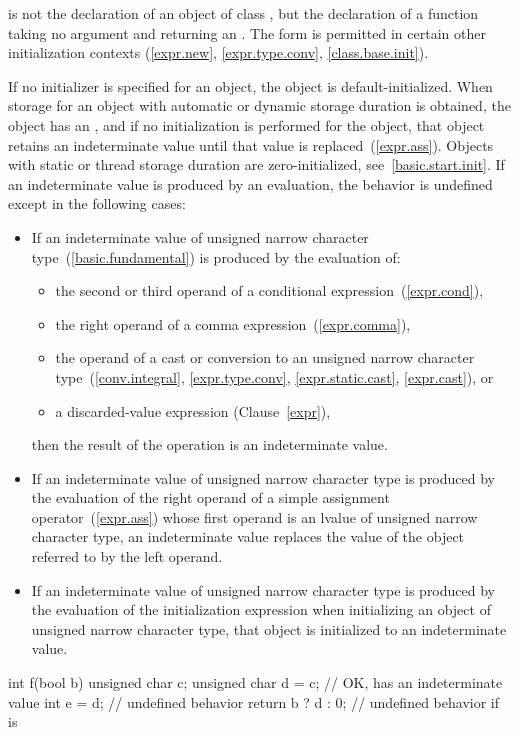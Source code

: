 is not the declaration of an object of class
,
but the declaration of a function taking no argument and returning an
.
The form
\tcode{()}
is permitted in certain other initialization contexts (\ref{expr.new},
\ref{expr.type.conv}, \ref{class.base.init}).
\exitnote

\pnum
{}%
%
If no initializer is specified for an object, the object is default-initialized.
When storage for an object with automatic or dynamic storage duration
is obtained, the object has an , and if
no initialization is performed for the object, that object retains an
indeterminate value until that value is replaced~(\ref{expr.ass}).
\enternote Objects with static or thread storage duration are zero-initialized,
see~\ref{basic.start.init}. \exitnote
If an indeterminate value is produced by an evaluation, the behavior is
undefined except in the following cases:

\begin{itemize}
\item
If an indeterminate value of unsigned narrow character
type~(\ref{basic.fundamental}) is produced by the evaluation of:
\begin{itemize}
\item the second or third operand of a conditional expression~(\ref{expr.cond}),
\item the right operand of a comma expression~(\ref{expr.comma}),
\item the operand of a cast or conversion to an unsigned narrow character
type~(\ref{conv.integral}, \ref{expr.type.conv}, \ref{expr.static.cast},
\ref{expr.cast}), or
\item a discarded-value expression (Clause~\ref{expr}),
\end{itemize}
then the result of the operation is an indeterminate value.

\item
If an indeterminate value of unsigned narrow character
type is produced by the evaluation of the right
operand of a simple assignment operator~(\ref{expr.ass}) whose first operand
is an lvalue of unsigned narrow character type, an indeterminate value replaces
the value of the object referred to by the left operand.

\item
If an indeterminate value of unsigned narrow character type is produced by the
evaluation of the initialization expression when initializing an object of
unsigned narrow character type, that object is initialized to an indeterminate
value.
\end{itemize}
\enterexample
\begin{codeblock}
  int f(bool b) {
    unsigned char c;
    unsigned char d = c; // OK,  has an indeterminate value
    int e = d;           // undefined behavior
    return b ? d : 0;    // undefined behavior if  is 
  }
\end{codeblock}
\exitexample

